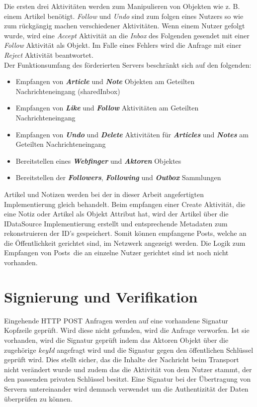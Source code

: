 Die ersten drei Aktivitäten werden zum Manipulieren von Objekten wie z. B. einem Artikel benötigt. \textit{Follow} und \textit{Undo} sind zum folgen eines Nutzers so wie zum rückgängig machen verschiedener Aktivitäten. Wenn einem Nutzer gefolgt wurde, wird eine \textit{Accept} Aktivität an die \textit{Inbox} des Folgenden gesendet mit einer \textit{Follow} Aktivität als Objekt. Im Falle eines Fehlers wird die Anfrage mit einer \textit{Reject} Aktivität beantwortet.\\

Der Funktionsumfang des förderierten Servers beschränkt sich auf den folgenden:
\begin{itemize}
	\item Empfangen von \textit{\textbf{Article}} und \textit{\textbf{Note}} Objekten am Geteilten Nachrichteneingang (sharedInbox)
	\item Empfangen von \textit{\textbf{Like}} und \textit{\textbf{Follow}} Aktivitäten am Geteilten Nachrichteneingang
	\item Empfangen von \textit{\textbf{Undo}} und \textit{\textbf{Delete}} Aktivitäten für \textit{\textbf{Articles}} und \textit{\textbf{Notes}} am Geteilten Nachrichteneingang 
	\item Bereitstellen eines \textit{\textbf{Webfinger}} und \textit{\textbf{Aktoren}} Objektes
	\item Bereitstellen der \textit{\textbf{Followers}}, \textit{\textbf{Following}} und \textit{\textbf{Outbox}} Sammlungen
\end{itemize}

Artikel und Notizen werden bei der in dieser Arbeit angefertigten Implementierung gleich behandelt. Beim empfangen einer Create Aktivität, die eine Notiz oder Artikel als Objekt Attribut hat, wird der Artikel über die IDataSource Implementierung erstellt und entsprechende Metadaten zum rekonstruieren der ID's gespeichert. Somit können empfangene \glqq Posts\grqq, welche an die Öffentlichkeit gerichtet sind, im Netzwerk angezeigt werden. Die Logik zum Empfangen von \glqq Posts\grqq~die an einzelne Nutzer gerichtet sind ist noch nicht vorhanden.\\

\section{Signierung und Verifikation}
Eingehende HTTP POST Anfragen werden auf eine vorhandene Signatur Kopfzeile geprüft. Wird diese nicht gefunden, wird die Anfrage verworfen. Ist sie vorhanden, wird die Signatur geprüft indem das Aktoren Objekt über die zugehörige \textit{keyId} angefragt wird und die Signatur gegen den öffentlichen Schlüssel geprüft wird. Dies stellt sicher, das die Inhalte der Nachricht beim Transport nicht verändert wurde und zudem das die Aktivität von dem Nutzer stammt, der den passenden privaten Schlüssel besitzt. Eine Signatur bei der Übertragung von Servern untereinander wird demnach verwendet um die Authentizität der Daten überprüfen zu können.\\

